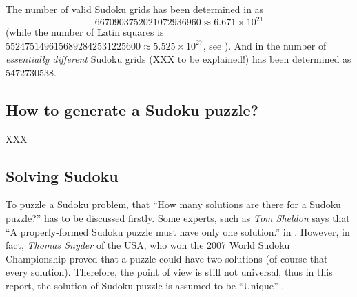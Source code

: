 \documentclass[11pt]{report}
\begin{document}
The number of valid Sudoku grids has been determined in \cite{FelgenhauerJarvis2006SudokuI} as
\begin{displaymath}
  6670903752021072936960 \approx 6.671 \times 10^{21}
\end{displaymath}
(while the number of Latin squares is $5524751496156892842531225600 \approx 5.525 \times 10^{27}$, see  \cite{FelgenhauerJarvis2006SudokuI}). And in \cite{FelgenhauerJarvis2006SudokuII} the number of \emph{essentially different} Sudoku grids (XXX to be explained!) has been determined as $5472730538$.



\subsection{How to generate a Sudoku puzzle?}
\label{sec:gensudoku}

XXX



\subsection{Solving Sudoku}
\label{sec:solvingsudoku}

To puzzle a Sudoku problem, that ``How many solutions are there for a Sudoku puzzle?'' has to be discussed firstly. Some experts, such as \emph{Tom Sheldon} says that ``A properly-formed Sudoku puzzle must have only one solution.'' in \cite{Sheldon2006Sudoku}. However, in fact, \emph{Thomas Snyder} of the USA, who won the 2007 World Sudoku Championship proved that a puzzle could have two solutions (of course that every solution). Therefore, the point of view is still not universal, thus in this report, the solution of Sudoku puzzle is assumed to be ``Unique'' .
\end{document}
